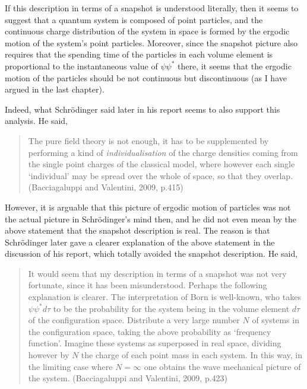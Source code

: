 If this description in terms of a snapshot is understood literally, then it seems to suggest that a quantum system is composed of point particles, and the continuous charge distribution of the system in space is formed by the ergodic motion of the system's point particles. 
Moreover, since the snapshot picture also requires that the spending time of the particles in each volume element is proportional to the  instantaneous value of $\psi\psi^*$ there, it seems that the ergodic motion of the particles should be not continuous but discontinuous (as I have argued in the last chapter).

Indeed, what Schr\"{o}dinger said later in his report seems to also support this analysis. He said,

 \begin{quote}  
The pure field theory is not enough, it has to be supplemented by performing a 
kind of {\em individualisation} of the charge densities coming from the single point charges of the
classical model, where however each single `individual' may be spread over the whole of space, so that they overlap. (Bacciagaluppi and Valentini, 2009, p.415)
 \end{quote} 

However, it is arguable that this picture of ergodic motion of particles was not the actual picture in Schr\"{o}dinger's mind then, and he did not even mean by the above statement that the snapshot description is real. The reason is that Schr\"{o}dinger later gave a clearer explanation of the above statement in the discussion of his report, which totally avoided the snapshot description. He said,

 \begin{quote}  
It would seem that my description in terms of a snapshot was not very fortunate, since it has been misunderstood. Perhaps the following explanation is clearer. The interpretation of Born is well-known, who takes $\psi\psi^*d\tau$ to be the probability for the system being in the volume element $d\tau$ of the configuration space. Distribute a very large number $N$ of systems in the configuration space, taking the above probability as `frequency function'. Imagine these systems as superposed in real space, dividing however by $N$ the charge of  each point mass in each system. In this way, in the limiting case where $N=\infty$ one obtains the wave mechanical picture of the system. (Bacciagaluppi and Valentini, 2009, p.423)
 \end{quote}  

